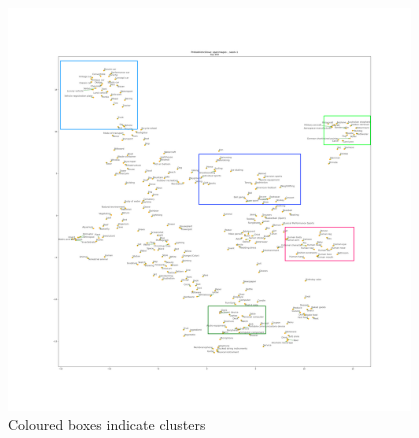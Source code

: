 \begin{figure}[H]
    \centering
    \includegraphics[width=0.95\textwidth]{images/method/probabilistic_independent/top300_tsne_openimages__ProbabilisticGlove_1_clusters.png}
    \caption{
        Coloured boxes indicate clusters 
    }
\end{figure}

